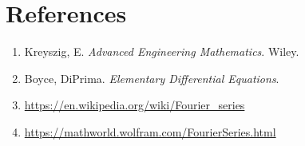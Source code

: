 \documentclass[12pt,a4paper]{article}
\begin{document}
\section{References}
\begin{enumerate}
    \item Kreyszig, E. \textit{Advanced Engineering Mathematics}. Wiley.
    \item Boyce, DiPrima. \textit{Elementary Differential Equations}.
    \item \url{https://en.wikipedia.org/wiki/Fourier_series}
    \item \url{https://mathworld.wolfram.com/FourierSeries.html}
\end{enumerate}
\end{document}
